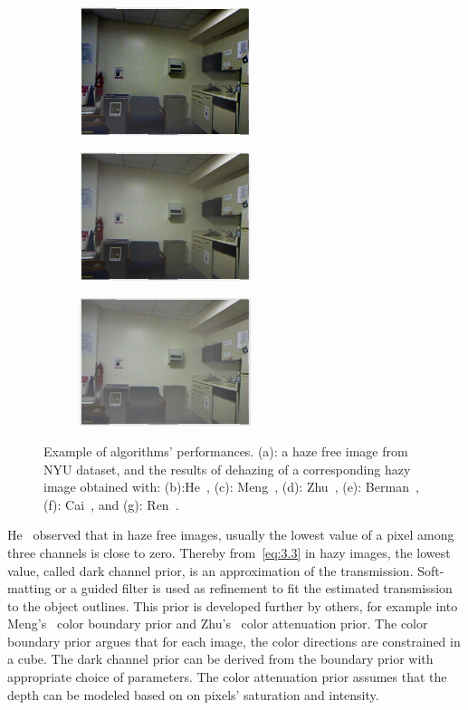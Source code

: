 \begin{figure}[htb]
\hfill
\begin{subfigure}[b]{0.45\linewidth}
  \centering
  \centerline{\includegraphics[width=5cm]{hazerd/nyu/dehaze_berman}}
  \subcaption{}
\end{subfigure}
\vfill
\begin{subfigure}[b]{0.45\linewidth}
  \centering
  \centerline{\includegraphics[width=5cm]{hazerd/nyu/dehaze_cai}}
  \subcaption{}
\end{subfigure}
\hfill
\begin{subfigure}[b]{0.45\linewidth}
  \centering
  \centerline{\includegraphics[width=5cm]{hazerd/nyu/dehaze_ren}}
  \subcaption{}
\end{subfigure}
\vfill
\caption{Example of algorithms' performances. (a): a haze free image from NYU dataset, and the results of dehazing of a corresponding hazy image obtained with: (b):He~\cite{he2011single}, (c): Meng~\cite{meng2013efficient}, (d): Zhu~\cite{zhu2015fast}, (e): Berman~\cite{berman2016non}, (f): Cai~\cite{cai2016dehazenet}, and (g): Ren~\cite{Ren-ECCV-2016}.}
\label{fig:3.exmaple.nyu}
\end{figure}

He~\cite{he2011single} observed that in haze free images, usually the lowest value of a pixel among three channels is close to  zero. Thereby from~\eqref{eq:3.3} in hazy images, the lowest value, called dark channel prior, is an approximation of the transmission. Soft-matting or a guided filter is used as refinement to fit the estimated transmission to the object outlines. This prior is developed further by others, for example into Meng's~\cite{meng2013efficient} color boundary prior and Zhu's~\cite{zhu2015fast} color attenuation prior. The color boundary prior argues that for each image, the color directions are constrained in a cube. The dark channel prior can be derived from the boundary prior with appropriate choice of parameters. The color attenuation prior assumes that the depth can be modeled based on on pixels' saturation and intensity.

